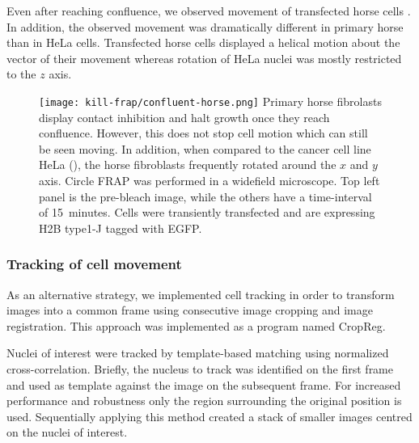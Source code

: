       Even after reaching confluence, we observed movement of transfected horse cells . 
	  In addition, the observed movement was dramatically different in primary horse than in HeLa cells.
	  Transfected horse cells displayed a helical motion about the vector of their movement 
	  whereas rotation of HeLa nuclei was mostly restricted to the $z$ axis.

      \begin{figure}
        \centering
        \texttt{[image: kill-frap/confluent-horse.png]}
          {
            Primary horse fibrolasts display contact inhibition and halt growth
            once they reach confluence. However, this does not stop cell
            motion which can still be seen moving. In addition, when compared
            to the cancer cell line HeLa (),
            the horse fibroblasts frequently rotated around the $x$ and $y$
            axis. Circle FRAP was performed in a widefield microscope.
            Top left panel is the pre-bleach image, while the others have a
            time-interval of 15~minutes. Cells were transiently transfected
            and are expressing H2B type1-J tagged with EGFP.
          }
        \label{fig:kill-frap:confluent-horse}
      \end{figure}

    \subsubsection{Tracking of cell movement}

      As an alternative strategy, we implemented cell tracking 
	  in order to transform images into a common frame using 
	  consecutive image cropping and image registration. 
	  This approach was implemented as a program named CropReg.

      Nuclei of interest were tracked by template-based matching using normalized cross-correlation. 
	  Briefly, the nucleus to track was identified on the first frame and 
	  used as template against the image on the subsequent frame.
	  For increased performance and robustness only the region surrounding the original position is used. 
	  Sequentially applying this method created a stack of smaller images centred on the nuclei of interest.

